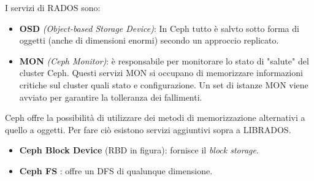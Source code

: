\documentclass{article}
\begin{document}
I servizi di RADOS sono:
\begin{itemize}
    \item \textbf{OSD} \textit{(Object-based Storage Device)}: In Ceph tutto è salvto sotto forma di oggetti (anche di dimensioni enormi) secondo un approccio replicato.
    \item \textbf{MON} \textit{(Ceph Monitor)}: è responsabile per monitorare lo stato di "salute" del cluster Ceph. Questi servizi MON si occupano di memorizzare informazioni critiche sul cluster quali stato e configurazione. Un set di istanze MON viene avviato per garantire la tolleranza dei fallimenti.
\end{itemize}
Ceph offre la possibilità di utilizzare dei metodi di memorizzazione alternativi a quello a oggetti. Per fare ciò esistono servizi aggiuntivi sopra a LIBRADOS.
\begin{itemize}
    \item \textbf{Ceph Block Device} (RBD in figura): fornisce il \textit{block storage}.
    \item \textbf{Ceph FS }: offre un DFS di qualunque dimensione.
\end{itemize}
\end{document}
